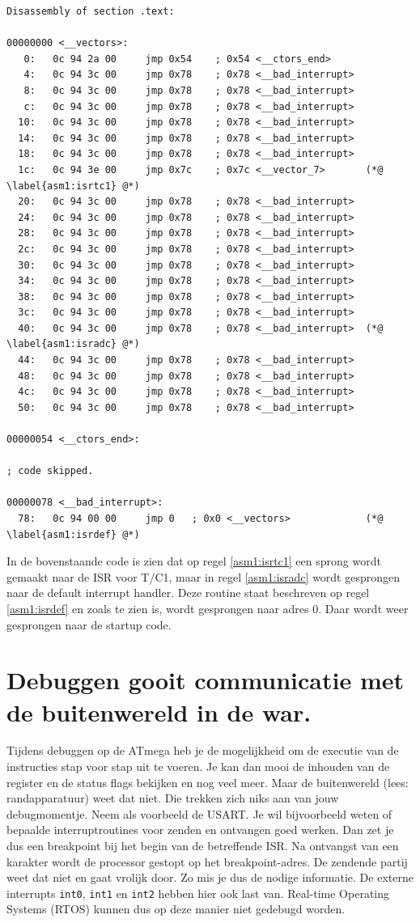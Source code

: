 \documentclass[12pt,a4paper,final,twoside,fleqn]{article}
\def\lstC{\lstinline[style=C]}
\begin{document}
\begin{lstlisting}[style=AVR,caption=Deel van de assemblercode]
Disassembly of section .text:

00000000 <__vectors>:
   0:	0c 94 2a 00 	jmp	0x54	; 0x54 <__ctors_end>
   4:	0c 94 3c 00 	jmp	0x78	; 0x78 <__bad_interrupt>
   8:	0c 94 3c 00 	jmp	0x78	; 0x78 <__bad_interrupt>
   c:	0c 94 3c 00 	jmp	0x78	; 0x78 <__bad_interrupt>
  10:	0c 94 3c 00 	jmp	0x78	; 0x78 <__bad_interrupt>
  14:	0c 94 3c 00 	jmp	0x78	; 0x78 <__bad_interrupt>
  18:	0c 94 3c 00 	jmp	0x78	; 0x78 <__bad_interrupt>
  1c:	0c 94 3e 00 	jmp	0x7c	; 0x7c <__vector_7>       (*@ \label{asm1:isrtc1} @*)
  20:	0c 94 3c 00 	jmp	0x78	; 0x78 <__bad_interrupt>
  24:	0c 94 3c 00 	jmp	0x78	; 0x78 <__bad_interrupt>
  28:	0c 94 3c 00 	jmp	0x78	; 0x78 <__bad_interrupt>
  2c:	0c 94 3c 00 	jmp	0x78	; 0x78 <__bad_interrupt>
  30:	0c 94 3c 00 	jmp	0x78	; 0x78 <__bad_interrupt>
  34:	0c 94 3c 00 	jmp	0x78	; 0x78 <__bad_interrupt>
  38:	0c 94 3c 00 	jmp	0x78	; 0x78 <__bad_interrupt>
  3c:	0c 94 3c 00 	jmp	0x78	; 0x78 <__bad_interrupt>
  40:	0c 94 3c 00 	jmp	0x78	; 0x78 <__bad_interrupt>  (*@ \label{asm1:isradc} @*)
  44:	0c 94 3c 00 	jmp	0x78	; 0x78 <__bad_interrupt>
  48:	0c 94 3c 00 	jmp	0x78	; 0x78 <__bad_interrupt>
  4c:	0c 94 3c 00 	jmp	0x78	; 0x78 <__bad_interrupt>
  50:	0c 94 3c 00 	jmp	0x78	; 0x78 <__bad_interrupt>

00000054 <__ctors_end>:

; code skipped.

00000078 <__bad_interrupt>:
  78:	0c 94 00 00 	jmp	0	; 0x0 <__vectors>             (*@ \label{asm1:isrdef} @*)  
\end{lstlisting}

In de bovenstaande code is zien dat op regel \ref{asm1:isrtc1} een sprong
wordt gemaakt naar de ISR voor T/C1, maar in regel \ref{asm1:isradc} wordt
gesprongen naar de default interrupt handler. Deze routine staat beschreven
op regel \ref{asm1:isrdef} en zoals te zien is, wordt gesprongen naar adres
0. Daar wordt weer gesprongen naar de startup code.

\section{Debuggen gooit communicatie met de buitenwereld in de war.}
Tijdens debuggen op de ATmega heb je de mogelijkheid om de executie van de
instructies stap voor stap uit te voeren. Je kan dan mooi de inhouden van de
register en de status flags bekijken en nog veel meer. Maar de buitenwereld
(lees: randapparatuur) weet dat niet. Die trekken zich niks aan van jouw
debugmomentje. Neem als voorbeeld de USART. Je wil bijvoorbeeld weten of
bepaalde interruptroutines voor zenden en ontvangen goed werken. Dan zet je
dus een breakpoint bij het begin van de betreffende ISR. Na ontvangst van
een karakter wordt de processor gestopt op het breakpoint-adres. De zendende
partij weet dat niet en gaat vrolijk door. Zo mis je dus de nodige informatie.
De externe interrupts \lstC{int0}, \lstC{int1} en \lstC{int2} hebben hier ook
last van. Real-time Operating Systems (RTOS) kunnen dus op deze manier niet
gedebugd worden.
\end{document}

